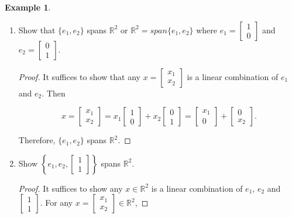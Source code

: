 \documentclass[12pt]{article}
\theoremstyle{definition}
\newtheorem*{example}{Example}
\begin{document}
\begin{example}
\begin{enumerate}[label = (\arabic*)]

\item Show that $\{ e_1, e_2 \}$ spans $\mathbb{R}^2$ or $\mathbb{R}^2 = span\{e_1, e_2 \}$
where $e_1 = \begin{bmatrix} 1 \\ 0 \end{bmatrix}$ and
$e_2 = \begin{bmatrix} 0 \\ 1 \end{bmatrix}$.

\begin{proof}
It suffices to show that any $x = \begin{bmatrix} x_1 \\ x_2 \end{bmatrix}$ is a linear
combination of $e_1$ and $e_2$. Then

\[
x =
\begin{bmatrix}
x_1 \\
x_2
\end{bmatrix}
=
x_1
\begin{bmatrix}
1 \\
0
\end{bmatrix}
+
x_2
\begin{bmatrix}
0 \\
1
\end{bmatrix}
=
\begin{bmatrix}
x_1 \\
0
\end{bmatrix}
+
\begin{bmatrix}
0 \\
x_2
\end{bmatrix}.
\]

Therefore, $\{ e_1, e_2 \}$ spans $\mathbb{R}^2$.
\end{proof}

\item Show $\left\{ e_1, e_2, \begin{bmatrix} 1 \\ 1 \end{bmatrix} \right\}$ spans $\mathbb{R}^2$.

\begin{proof}
It suffices to show any $x \in \mathbb{R}^2$ is a linear combination of $e_1$, $e_2$ and
$\begin{bmatrix} 1 \\ 1 \end{bmatrix}$. For any 
$x = \begin{bmatrix} x_1 \\ x_2 \end{bmatrix} \in \mathbb{R}^2$,


\end{proof}
\end{enumerate}
\end{example}
\end{document}
